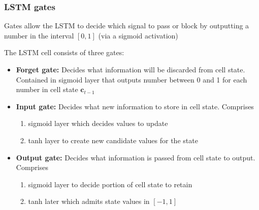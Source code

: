 \documentclass[smaller]{beamer}
\begin{document}





\begin{frame}
  \frametitle{LSTM gates}
  \pause

   Gates allow the LSTM to decide which signal to pass or block by outputting a number in the interval $[0,1]$ (via a sigmoid activation) \pause

   \bigskip
   
   The LSTM cell consists of three gates:
    

    \begin{itemize}
    \item \textbf{\rd Forget gate:} Decides what information will be discarded from cell state. Contained in sigmoid layer that outputs number between 0 and 1 for each number in cell state $\bm{c}_{t-1}$\pause
    \item \textbf{\og Input gate:} Decides what new information to store in cell state. Comprises
      \begin{enumerate}[\bf (a)]
      \item sigmoid layer which decides values to update \pause
      \item tanh layer to create new candidate values for the state
    \end{enumerate}
\pause
\item \textbf{\gr Output gate:} Decides what information is passed from cell state to output. Comprises
  \begin{enumerate}[\bf (a)]
  \item  sigmoid layer to decide portion of cell state to retain \pause
  \item tanh later which admits state values in $[-1,1]$
\end{enumerate}
 
    \end{itemize}

\end{frame}
\end{document}

